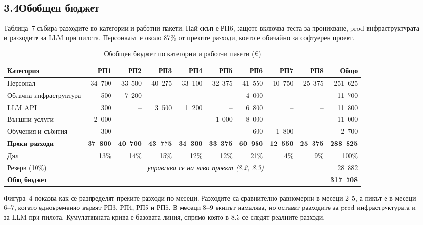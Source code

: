\documentclass[11pt,a4paper]{article}
\begin{document}
\subsection*{3.4\quad Обобщен бюджет}
Таблица~7 събира разходите по категории и работни пакети. Най-скъп е РП6, защото включва теста за проникване, prod инфраструктурата и разходите за LLM при пилота. Персоналът е около 87\% от преките разходи, което е обичайно за софтуерен проект.
{\small\setlength{\tabcolsep}{3.4pt}
\begin{table}[H]\centering
\caption{Обобщен бюджет по категории и работни пакети (\euro{})}\label{tab:budget}
\begin{tabular}{@{}lrrrrrrrrr@{}}
\toprule
\textbf{Категория} & \textbf{РП1} & \textbf{РП2} & \textbf{РП3} & \textbf{РП4} & \textbf{РП5} & \textbf{РП6} & \textbf{РП7} & \textbf{РП8} & \textbf{Общо}\\
\midrule
Персонал & 34~700 & 33~500 & 40~275 & 33~100 & 32~375 & 41~550 & 10~750 & 25~375 & 251~625\\
Облачна инфраструктура & 500 & 7~200 & -- & -- & -- & 4~000 & -- & -- & 11~700\\
LLM API & 300 & -- & 3~500 & 1~200 & -- & 6~800 & -- & -- & 11~800\\
Външни услуги & 2~000 & -- & -- & -- & 1~000 & 8~000 & -- & -- & 11~000\\
Обучения и събития & 300 & -- & -- & -- & -- & 600 & 1~800 & -- & 2~700\\
\midrule
\textbf{Преки разходи} & \textbf{37~800} & \textbf{40~700} & \textbf{43~775} & \textbf{34~300} & \textbf{33~375} & \textbf{60~950} & \textbf{12~550} & \textbf{25~375} & \textbf{288~825}\\
Дял & 13\% & 14\% & 15\% & 12\% & 12\% & 21\% & 4\% & 9\% & 100\%\\
Резерв (10\%) & \multicolumn{8}{c}{\textit{управлява се на ниво проект (8.2, 8.3)}} & 28~882\\
\midrule
\textbf{Общ бюджет} & \multicolumn{8}{c}{} & \textbf{317~708}\\
\bottomrule\end{tabular}\end{table}}

Фигура~4 показва как се разпределят преките разходи по месеци. Разходите са сравнително равномерни в месеци 2--5, а пикът е в месеци 6--7, когато едновременно вървят РП3, РП4, РП5 и РП6. В месеци 8--9 екипът намалява, но остават разходите за prod инфраструктурата и за LLM при пилота. Кумулативната крива е базовата линия, спрямо която в 8.3 се следят реалните разходи.
\end{document}
